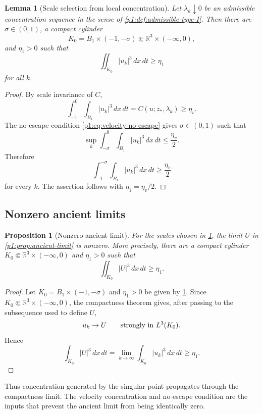 \documentclass[11pt]{amsart}
\theoremstyle{plain}
\newtheorem{lemma}[lemma]{Lemma}
\newtheorem{proposition}[proposition]{Proposition}
\theoremstyle{definition}
\theoremstyle{remark}
\numberwithin{equation}{section}
\newcommand{\R}{\mathbb R}
\begin{document}
\begin{lemma}[Scale selection from local concentration]\label{p1:lem:scale-selection}
Let \(\lambda_k\downarrow0\) be an admissible concentration sequence in the
sense of \cref{p1:def:admissible-type-I}.  Then there are
\(\sigma\in(0,1)\), a compact cylinder
\[
   K_0=B_1\times(-1,-\sigma)\Subset\R^3\times(-\infty,0),
\]
and \(\eta_1>0\) such that
\begin{equation}\label{p1:eq:selected-lower-bound}
   \iint_{K_0}|u_k|^3\,dx\,dt\ge\eta_1
\end{equation}
for all \(k\).
\end{lemma}

\begin{proof}
By scale invariance of \(C\),
\[
   \int_{-1}^{0}\int_{B_1}|u_k|^3\,dx\,dt
   =
   C(u;z_*,\lambda_k)\ge\eta_v .
\]
The no-escape condition \eqref{p1:eq:velocity-no-escape} gives
\(\sigma\in(0,1)\) such that
\[
   \sup_k\int_{-\sigma}^{0}\int_{B_1}|u_k|^3\,dx\,dt
   \le \frac{\eta_v}{2}.
\]
Therefore
\[
   \int_{-1}^{-\sigma}\int_{B_1}|u_k|^3\,dx\,dt
   \ge \frac{\eta_v}{2}
\]
for every \(k\).  The assertion follows with
\(\eta_1=\eta_v/2\).
\end{proof}

\subsection{Nonzero ancient limits}

\begin{proposition}[Nonzero ancient limit]\label{p1:prop:nonzero}
For the scales chosen in \cref{p1:lem:scale-selection}, the limit \(U\) in
\cref{p1:prop:ancient-limit} is nonzero.  More precisely, there are a compact
cylinder \(K_0\Subset\R^3\times(-\infty,0)\) and \(\eta_1>0\) such that
\[
   \iint_{K_0}|U|^3\,dx\,dt\ge\eta_1 .
\]
\end{proposition}

\begin{proof}
Let \(K_0=B_1\times(-1,-\sigma)\) and \(\eta_1>0\) be given by
\cref{p1:lem:scale-selection}.  Since
\(K_0\Subset\R^3\times(-\infty,0)\), the compactness theorem gives, after
passing to the subsequence used to define \(U\),
\[
   u_k\to U\qquad\hbox{strongly in }L^3(K_0).
\]
Hence
\[
   \int_{K_0}|U|^3\,dx\,dt
   =
   \lim_{k\to\infty}\int_{K_0}|u_k|^3\,dx\,dt
   \ge\eta_1 .
\]
\end{proof}

Thus concentration generated by the singular point propagates through the
compactness limit.  The velocity concentration and no-escape condition are the
inputs that prevent the ancient limit from being identically zero.
\end{document}

